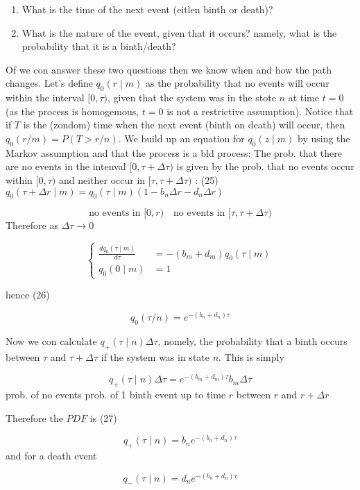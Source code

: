 \begin{enumerate}
  \item What is the time of the next event (eitlen binth or death)?
  \item What is the nature of the event, given that it occurs? namely, what is the probability that it is a binth/death?
\end{enumerate}
Of we con answer these two questions then we know when and how the path changes.
Let's define $q_{0}(r \mid m)$ as the probability that no events will occur within the interval $[0, \tau)$, given that the system was in the stote $n$ at time $t=0$ (as the process is homogemous, $t=0$ is not a restrictive assumption).
Notice that if $T$ is the (zondom) time when the next event (binth on death) will occur, then $q_{0}(r / m)=P(T>r / n)$.
We build up an equation for $q_{0}(z \mid m)$ by using the Markov assumption and that the process is a bld process:
The prob. that there are no events in the intenval $[0, \tau+\Delta \tau)$ is given by the prob. that no events occur within $[0, \tau)$ and neither occur in $[\tau, \tau+\Delta \tau)$ :
(25) $q_{0}(\tau+\Delta r \mid m)=q_{0}(\tau \mid m)\left(1-b_{n} \Delta r-d_{n} \Delta r\right)$

$$ \text{no events in } [0, r) \quad \text{no events in } [\tau, \tau+\Delta \tau)
$$ 
Therefore as $\Delta \tau \rightarrow 0$

$$ \left\{\begin{aligned}
\frac{d q_{0}(\tau \mid m)}{d \tau} & =-\left(b_{m}+d_{m}\right) q_{0}(\tau \mid m) \\ q_{0}(0 \mid m) & =1
\end{aligned}\right.
$$ 

hence
(26)

$$ q_{0}(\tau / n)=e^{-\left(b_{n}+d_{n}\right) \tau}
$$ 

Now we con calculate $q_{+}(\tau \mid n) \Delta \tau$, nomely, the probability that a binth occurs between $\tau$ and $\tau+\Delta \tau$ if the system was in state $n$. This is simply

$$ q_{+}(\tau \mid n) \Delta \tau=e^{-\left(b_{m}+d_{m}\right) \tau} b_{m} \Delta \tau
$$ 
prob. of no events prob. of 1 binth event up to time $r$ between $r$ and $r+\Delta r$

Therefore the $P D F$ is
(27)

$$ q_{+}(\tau \mid n)=b_{n} e^{-\left(b_{n}+d_{n}\right) \tau}
$$ 
and for a death event


\begin{equation*}
q_{-}(\tau \mid n)=d_{n} e^{-\left(b_{n}+d_{n}\right) \tau} \tag{28}
\end{equation*}


